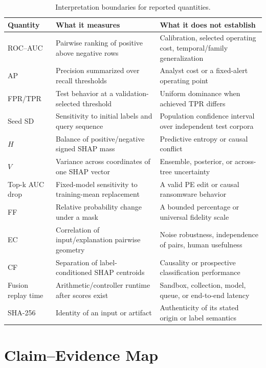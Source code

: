 \begin{table}[h]
\centering
\caption{Interpretation boundaries for reported quantities.}
\label{tab:metric-boundaries}
\small
\begin{tabular}{p{2cm}p{5.2cm}p{7.6cm}}
\toprule
Quantity & What it measures & What it does not establish \\
\midrule
ROC--AUC & Pairwise ranking of positive above negative rows & Calibration, selected operating cost, temporal/family generalization \\
AP & Precision summarized over recall thresholds & Analyst cost or a fixed-alert operating point \\
FPR/TPR & Test behavior at a validation-selected threshold & Uniform dominance when achieved TPR differs \\
Seed SD & Sensitivity to initial labels and query sequence & Population confidence interval over independent test corpora \\
$H$ & Balance of positive/negative signed SHAP mass & Predictive entropy or causal conflict \\
$V$ & Variance across coordinates of one SHAP vector & Ensemble, posterior, or across-tree uncertainty \\
Top-k AUC drop & Fixed-model sensitivity to training-mean replacement & A valid PE edit or causal ransomware behavior \\
FF & Relative probability change under a mask & A bounded percentage or universal fidelity scale \\
EC & Correlation of input/explanation pairwise geometry & Noise robustness, independence of pairs, human usefulness \\
CF & Separation of label-conditioned SHAP centroids & Causality or prospective classification performance \\
Fusion replay time & Arithmetic/controller runtime after scores exist & Sandbox, collection, model, queue, or end-to-end latency \\
SHA-256 & Identity of an input or artifact & Authenticity of its stated origin or label semantics \\
\bottomrule
\end{tabular}
\end{table}

\section{Claim--Evidence Map}

